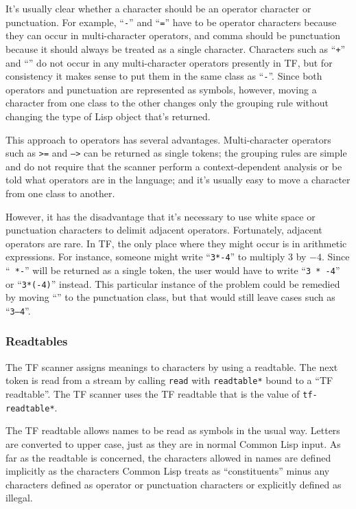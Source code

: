 It's usually clear whether a character should be an operator
character or punctuation.  For example, ``{\tt -}'' and ``{\tt =}''
have to be operator characters because they can occur in
multi-character operators, and comma should be punctuation because
it should always be treated as a single character.  Characters
such as ``{\tt +}'' and ``{\tt *}'' do not occur in any
multi-character operators presently in TF, but for consistency
it makes sense to put them in the same class as ``{\tt -}''.
Since both operators and punctuation are represented as symbols,
however, moving a character from one class to the other changes
only the grouping rule without changing the type of Lisp object
that's returned.

This approach to operators has several advantages.
Multi-character operators such as {\tt >=} and {\tt --->} can be
returned as single tokens; the grouping rules are simple and do not
require that the scanner perform a context-dependent analysis or be
told what operators are in the language; and it's usually easy to
move a character from one class to another.  

However, it has the disadvantage that it's necessary to use white
space or punctuation characters to delimit adjacent operators.
Fortunately, adjacent operators are rare.  In TF, the only place where
they might occur is in arithmetic expressions.  For instance, someone
might write ``{\tt 3*-4}'' to multiply $3$ by $-4$.  Since ``{\tt
*-}'' will be returned as a single token, the user would have to
write ``{\tt 3 * -4}'' or ``{\tt 3*(-4)}'' instead.  This particular
instance of the problem could be remedied by moving ``{\tt *}'' to
the punctuation class, but that would still leave cases such as 
``{\tt 3--4}''.

\subsubsection{Readtables}

The TF scanner assigns meanings to characters by using a readtable.
The next token is read from a stream by calling {\tt read} with
{\tt *readtable*} bound to a ``TF readtable''. The TF scanner
uses the TF readtable that is the value of {\tt *tf-readtable*}.

The TF readtable allows names to be read as symbols in the usual way.
Letters are converted to upper case, just as they are in normal Common
Lisp input.  As far as the readtable is concerned, the characters
allowed in names are defined implicitly as the characters Common Lisp
treats as ``constituents'' minus any characters defined as operator
or punctuation characters or explicitly defined as illegal.

